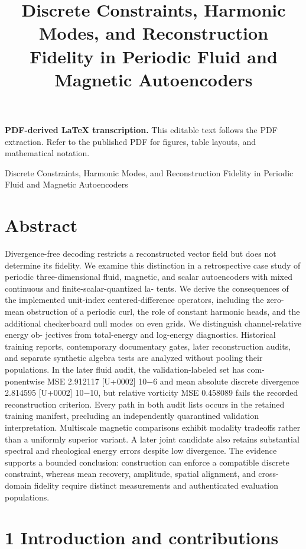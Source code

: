 \documentclass[11pt]{article}
\title{Discrete Constraints, Harmonic Modes, and Reconstruction Fidelity in Periodic Fluid and Magnetic Autoencoders}
\author{}
\date{}
\begin{document}
\maketitle
\noindent\textbf{PDF-derived LaTeX transcription.} This editable text follows the PDF extraction. Refer to the published PDF for figures, table layouts, and mathematical notation.


Discrete Constraints, Harmonic Modes, and Reconstruction Fidelity
in Periodic Fluid and Magnetic Autoencoders

\section*{Abstract}

Divergence-free decoding restricts a reconstructed vector field but does not determine its
fidelity. We examine this distinction in a retrospective case study of periodic three-dimensional
fluid, magnetic, and scalar autoencoders with mixed continuous and finite-scalar-quantized la-
tents. We derive the consequences of the implemented unit-index centered-difference operators,
including the zero-mean obstruction of a periodic curl, the role of constant harmonic heads, and
the additional checkerboard null modes on even grids. We distinguish channel-relative energy ob-
jectives from total-energy and log-energy diagnostics. Historical training reports, contemporary
documentary gates, later reconstruction audits, and separate synthetic algebra tests are analyzed
without pooling their populations. In the later fluid audit, the validation-labeled set has com-
ponentwise MSE 2.912117 [U+0002] 10\ensuremath{-}6 and mean absolute discrete divergence 2.814595 [U+0002] 10\ensuremath{-}10, but
relative vorticity MSE 0.458089 fails the recorded reconstruction criterion. Every path in both
audit lists occurs in the retained training manifest, precluding an independently quarantined
validation interpretation. Multiscale magnetic comparisons exhibit modality tradeoffs rather
than a uniformly superior variant. A later joint candidate also retains substantial spectral and
rheological energy errors despite low divergence. The evidence supports a bounded conclusion:
construction can enforce a compatible discrete constraint, whereas mean recovery, amplitude,
spatial alignment, and cross-domain fidelity require distinct measurements and authenticated
evaluation populations.

\section*{1 Introduction and contributions}
\end{document}
